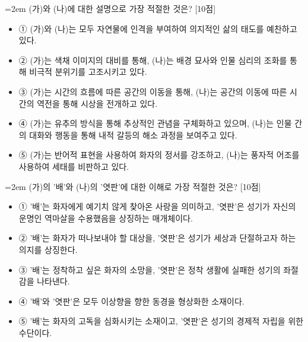 \documentclass[10pt,a4paper]{article}
\newcommand{\qnum}[1]{%
  \tikz[baseline=(num.base)]{%
    \node[circle, fill=numCircle, text=white, inner sep=0pt,
          minimum size=18pt, font=\small\bfseries] (num) {#1};%
  }%
}
\newcommand{\pts}[1]{%
  \hfill\textcolor{ptsBadge}{[#1점]}%
}
\begin{document}
\begin{minipage}{\columnwidth}
{\hangindent=2em
\qnum{1}\enspace (가)와 (나)에 대한 설명으로 가장 적절한 것은? \pts{10}
\par}

\vspace{3mm}
\begin{itemize}[leftmargin=2.5em, labelsep=0.3em, label={}, itemsep=4pt, parsep=1pt, topsep=0pt]
  \item ① (가)와 (나)는 모두 자연물에 인격을 부여하여 의지적인 삶의 태도를 예찬하고 있다.
  \item ② (가)는 색채 이미지의 대비를 통해, (나)는 배경 묘사와 인물 심리의 조화를 통해 비극적 분위기를 고조시키고 있다.
  \item ③ (가)는 시간의 흐름에 따른 공간의 이동을 통해, (나)는 공간의 이동에 따른 시간의 역전을 통해 시상을 전개하고 있다.
  \item ④ (가)는 유추의 방식을 통해 추상적인 관념을 구체화하고 있으며, (나)는 인물 간의 대화와 행동을 통해 내적 갈등의 해소 과정을 보여주고 있다.
  \item ⑤ (가)는 반어적 표현을 사용하여 화자의 정서를 강조하고, (나)는 풍자적 어조를 사용하여 세태를 비판하고 있다.
\end{itemize}
\end{minipage}
\vspace{4mm}

\vspace{4mm}
\begin{minipage}{\columnwidth}
{\hangindent=2em
\qnum{2}\enspace (가)의 '배'와 (나)의 '엿판'에 대한 이해로 가장 적절한 것은? \pts{10}
\par}

\vspace{3mm}
\begin{itemize}[leftmargin=2.5em, labelsep=0.3em, label={}, itemsep=4pt, parsep=1pt, topsep=0pt]
  \item ① '배'는 화자에게 예기치 않게 찾아온 사랑을 의미하고, '엿판'은 성기가 자신의 운명인 역마살을 수용했음을 상징하는 매개체이다.
  \item ② '배'는 화자가 떠나보내야 할 대상을, '엿판'은 성기가 세상과 단절하고자 하는 의지를 상징한다.
  \item ③ '배'는 정착하고 싶은 화자의 소망을, '엿판'은 정착 생활에 실패한 성기의 좌절감을 나타낸다.
  \item ④ '배'와 '엿판'은 모두 이상향을 향한 동경을 형상화한 소재이다.
  \item ⑤ '배'는 화자의 고독을 심화시키는 소재이고, '엿판'은 성기의 경제적 자립을 위한 수단이다.
\end{itemize}
\end{minipage}
\vspace{4mm}
\end{document}

